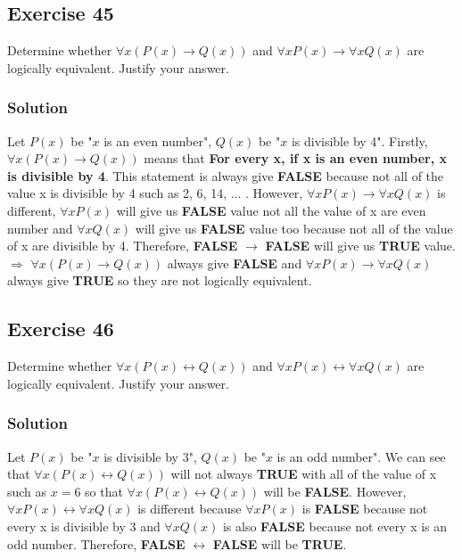 \documentclass{article}
\begin{document}
\subsection*{Exercise 45}
Determine whether $\forall x(P(x) \rightarrow Q(x))$ and $\forall xP(x) \rightarrow \forall xQ(x)$ are logically equivalent. Justify your answer.
\subsubsection*{Solution}
Let $P(x)$ be "$x$ is an even number", $Q(x)$ be "$x$ is divisible by 4". Firstly, $\forall x(P(x) \rightarrow Q(x))$ means that \textbf{For every x, if x is an even number, x is divisible by 4}. This statement is always give \textbf{FALSE} because not all of the value x is divisible by 4 such as 2, 6, 14, ... . However, $\forall xP(x) \rightarrow \forall xQ(x)$ is different, $\forall xP(x)$ will give us \textbf{FALSE} value not all the value of x are even number and $\forall xQ(x)$ will give us \textbf{FALSE} value too because not all of the value of x are divisible by 4. Therefore, \textbf{FALSE} $\rightarrow$ \textbf{FALSE} will give us \textbf{TRUE} value.\\

$\Rightarrow$ $\forall x(P(x) \rightarrow Q(x))$ always give \textbf{FALSE} and $\forall xP(x) \rightarrow \forall xQ(x)$ always give \textbf{TRUE} so they are not logically equivalent.
\subsection*{Exercise 46}
Determine whether $\forall x(P(x) \leftrightarrow Q(x))$ and $\forall xP(x) \leftrightarrow \forall xQ(x)$ are logically equivalent. Justify your answer.
\subsubsection*{Solution}
Let $P(x)$ be "$x$ is divisible by 3", $Q(x)$ be "$x$ is an odd number". We can see that $\forall x(P(x) \leftrightarrow Q(x))$ will not always \textbf{TRUE} with all of the value of x such as $x = 6$ so that $\forall x(P(x) \leftrightarrow Q(x))$ will be \textbf{FALSE}. However, $\forall xP(x) \leftrightarrow \forall xQ(x)$ is different because $\forall xP(x)$ is \textbf{FALSE} because not every x is divisible by 3 and $\forall xQ(x)$ is also \textbf{FALSE} because not every x is an odd number. Therefore, \textbf{FALSE} $\leftrightarrow$ \textbf{FALSE} will be \textbf{TRUE}.\\
\end{document}
